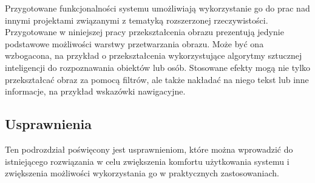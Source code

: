 \documentclass[a4paper,11pt,twoside]{report}
\theoremstyle{definition}
\begin{document}
Przygotowane funkcjonalności systemu umożliwiają wykorzystanie go do prac nad innymi projektami związanymi z tematyką rozszerzonej rzeczywistości. Przygotowane w niniejszej pracy przekształcenia obrazu prezentują jedynie podstawowe możliwości warstwy przetwarzania obrazu. Może być ona wzbogacona, na przykład o przekształcenia wykorzystujące algorytmy sztucznej inteligencji do rozpoznawania obiektów lub osób. Stosowane efekty mogą nie tylko przekształcać obraz za pomocą filtrów, ale także nakładać na niego tekst lub inne informacje, na przykład wskazówki nawigacyjne.

\subsection{Usprawnienia}

Ten podrozdział poświęcony jest usprawnieniom, które można wprowadzić do istniejącego rozwiązania w celu zwiększenia komfortu użytkowania systemu i zwiększenia możliwości wykorzystania go w praktycznych zastosowaniach.
\end{document}
